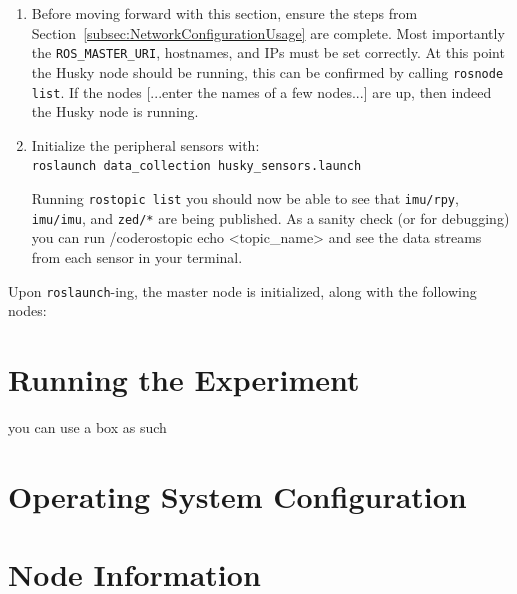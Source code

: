 \documentclass[
	12pt, %
]{fphw}
\newcommand{\code}[1]{\colorbox{light-gray}{\texttt{#1}}}
\begin{document}
\begin{enumerate}
\item Before moving forward with this section, ensure the steps from Section~\ref{subsec:NetworkConfigurationUsage} are complete. Most importantly the \code{ROS\_MASTER\_URI}, hostnames, and IPs must be set correctly. At this point the Husky node should be running, this can be confirmed by calling \code{rosnode list}. If the nodes [...enter the names of a few nodes...] are up, then indeed the Husky node is running.
	
\item Initialize the peripheral sensors with: \\
  \code{roslaunch data\_collection husky\_sensors.launch}
  
\qquad Running \code{rostopic list} you should now be able to see that \code{imu/rpy}, \code{imu/imu}, and \code{zed/*} are being published. As a sanity check (or for debugging) you can run /code{rostopic echo <topic\_name>} and see the data streams from each sensor in your terminal.

\end{enumerate}

Upon \code{roslaunch}-ing, the master node is initialized, along with the following nodes:



\section{Running the Experiment}

\begin{problem}
you can use a box as such
\end{problem}

\cleardoublepage
\appendix

\section{Operating System Configuration}
\label{app:OperatingSystemConfiguration}

\section{Node Information}
\label{app:NodeInformation}
\end{document}
